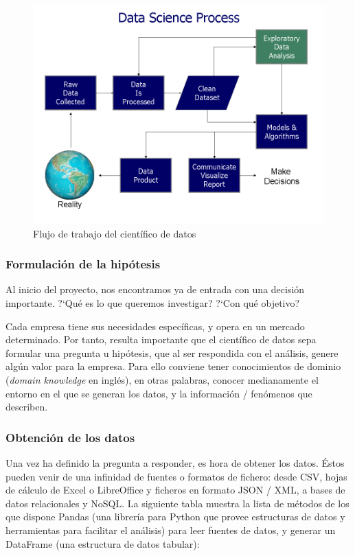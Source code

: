 \begin{figure}[ht!]
  \centering
  \includegraphics[scale = 0.65]{img/data_science_process.png}
  \caption{\label{fig:dataScienceWorkflow} Flujo de trabajo del científico de datos}
\end{figure}


\subsubsection{Formulación de la hipótesis}
\label{subsec:state_dataScience_workflow_1}

Al inicio del proyecto, nos encontramos ya de entrada con una decisión
importante. ?`Qué es lo que queremos investigar? ?`Con qué objetivo?

Cada empresa tiene sus necesidades específicas, y opera en un mercado
determinado. Por tanto, resulta importante que el científico de datos sepa
formular una pregunta u hipótesis, que al ser respondida con el análisis, genere
algún valor para la empresa. Para ello conviene tener conocimientos de dominio
(\emph{domain knowledge} en inglés), en otras palabras, conocer medianamente
el entorno en el que se generan los datos, y la información / fenómenos que describen.

\subsubsection{Obtención de los datos}
\label{subsec:state_dataScience_workflow_1}

Una vez ha definido la pregunta a responder, es hora de obtener los
datos. Éstos pueden venir de una infinidad de fuentes o formatos de fichero:
desde CSV, hojas de cálculo de Excel o LibreOffice y ficheros en formato JSON /
XML, a bases de datos relacionales y NoSQL. La siguiente tabla muestra la lista
de métodos de los que dispone Pandas (una librería para Python que provee
estructuras de datos y herramientas para facilitar el análisis) para leer
fuentes de datos, y generar un DataFrame (una estructura de datos tabular):

